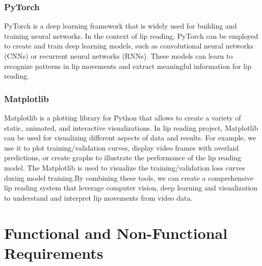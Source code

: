 \subsubsection{PyTorch}
PyTorch is a deep learning framework that is widely used for building and training neural networks. In the context of lip reading, PyTorch can be employed to create and train deep learning models, such as convolutional neural networks (CNNs) or recurrent neural networks (RNNs). These models can learn to recognize patterns in lip movements and extract meaningful information for lip reading.
\break
\subsubsection{Matplotlib}
Matplotlib is a plotting library for Python that allows  to create a variety of static, animated, and interactive visualizations. In  lip reading project, Matplotlib can be used for visualizing different aspects of  data and results. For example, we use it to plot training/validation curves, display video frames with overlaid predictions, or create graphs to illustrate the performance of the lip reading model. The Matplotlib is used to visualize the training/validation loss curves during model training.By combining these tools, we can create a comprehensive lip reading system that leverage computer vision, deep learning and visualization to understand and interpret lip movements from video data.

\break
\section{Functional and Non-Functional Requirements}
